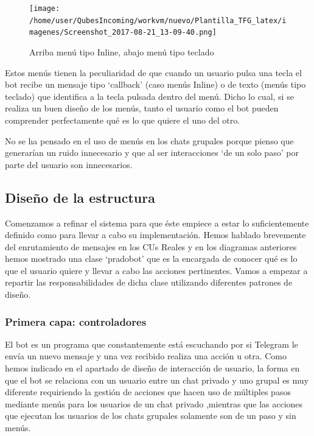 \begin{figure}[H] %
\centering
\texttt{[image: /home/user/QubesIncoming/workvm/nuevo/Plantilla\_TFG\_latex/imagenes/Screenshot\_2017-08-21\_13-09-40.png]}  %

\caption{Arriba menú tipo Inline, abajo menú tipo teclado}\label{figura10}
\end{figure}
Estos menús tienen la peculiaridad de que cuando un usuario pulsa una tecla  el bot recibe un mensaje tipo \enquote*{callback} (caso menús Inline) o de texto (menús tipo teclado) que identifica a la tecla pulsada dentro del menú.  Dicho lo cual, si se realiza un buen diseño de los menús, tanto el usuario como el bot pueden comprender perfectamente qué es lo que quiere el uno del otro.
\par
No se ha pensado en el uso de menús en los chats grupales porque pienso que generarían un ruido innecesario y que al ser interacciones \enquote*{de un solo paso} por parte del usuario son innecesarios.

\subsection{Diseño de la estructura}

Comenzamos a refinar el sistema para que éste empiece a estar lo suficientemente definido como para llevar a cabo su implementación. Hemos hablado brevemente del enrutamiento de mensajes en los CUs Reales y  en los diagramas anteriores hemos mostrado una clase \enquote*{pradobot} que es la encargada de conocer qué es lo que el usuario quiere y llevar a cabo las acciones pertinentes. Vamos a empezar a repartir las responsabilidades de dicha clase utilizando diferentes patrones de diseño. 
\subsubsection{Primera capa: controladores}

El bot es un programa que constantemente está escuchando por si Telegram le envía un nuevo mensaje y una vez recibido realiza una acción u otra.
Como hemos indicado en el apartado de diseño de interacción de usuario, la forma en que el bot se relaciona con un usuario entre un chat privado y uno grupal es muy diferente requiriendo la gestión de acciones que hacen uso de múltiples pasos mediante  menús para los usuarios de un chat privado ,mientras que las acciones que ejecutan los usuarios de los chats grupales solamente son de un paso y sin menús.

